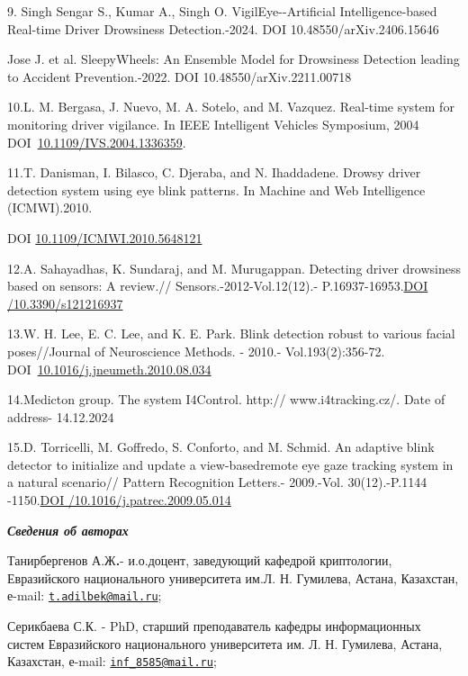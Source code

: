 9. Singh Sengar S., Kumar A., Singh O. VigilEye-\/-Artificial
Intelligence-based Real-time Driver Drowsiness Detection.-2024. DOI
10.48550/arXiv.2406.15646

Jose J. et al. SleepyWheels: An Ensemble Model for Drowsiness Detection
leading to Accident Prevention.-2022. DOI 10.48550/arXiv.2211.00718

10.L. M. Bergasa, J. Nuevo, M. A. Sotelo, and M. Vazquez. Real-time
system for monitoring driver vigilance. In IEEE Intelligent Vehicles
Symposium, 2004
DOI~\href{https://doi.org/10.1109/IVS.2004.1336359}{10.1109/IVS.2004.1336359}.

11.T. Danisman, I. Bilasco, C. Djeraba, and N. Ihaddadene. Drowsy driver
detection system using eye blink patterns. In Machine and Web
Intelligence (ICMWI).2010.

DOI
\href{http://dx.doi.org/10.1109/ICMWI.2010.5648121}{10.1109/ICMWI.2010.5648121}

12.A. Sahayadhas, K. Sundaraj, and M. Murugappan. Detecting driver
drowsiness based on sensors: A review.// Sensors.-2012-Vol.12(12).-
P.16937-16953.\href{https://doi.org/10.3390/s121216937}{DOI
/10.3390/s121216937}

13.W. H. Lee, E. C. Lee, and K. E. Park. Blink detection robust to
various facial poses//Journal of Neuroscience Methods. - 2010.-
Vol.193(2):356-72.
DOI~\href{https://doi.org/10.1016/j.jneumeth.2010.08.034}{10.1016/j.jneumeth.2010.08.034}

14.Medicton group. The system I4Control. http:// www.i4tracking.cz/.
Date of address- 14.12.2024

15.D. Torricelli, M. Goffredo, S. Conforto, and M. Schmid. An adaptive
blink detector to initialize and update a view-basedremote eye gaze
tracking system in a natural scenario// Pattern Recognition Letters.-
2009.-Vol. 30(12).-P.1144
-1150.\href{https://doi.org/10.1016/j.patrec.2009.05.014}{DOI
/10.1016/j.patrec.2009.05.014}

\emph{{\bfseries Сведения об авторах}}

Танирбергенов А.Ж{\bfseries .}- и.о.доцент, заведующий кафедрой
криптологии, Евразийского национального университета им.Л. Н. Гумилева,
Астана, Казахстан, е-mail:
\href{mailto:t.adilbek@mail.ru}{\nolinkurl{t.adilbek@mail.ru}};

Серикбаева С.К. - PhD, старший преподаватель кафедры информационных
систем Евразийского национального университета им. Л. Н. Гумилева,
Астана, Казахстан, е-mail:
\href{mailto:inf_8585@mail.ru}{\nolinkurl{inf\_8585@mail.ru}};

